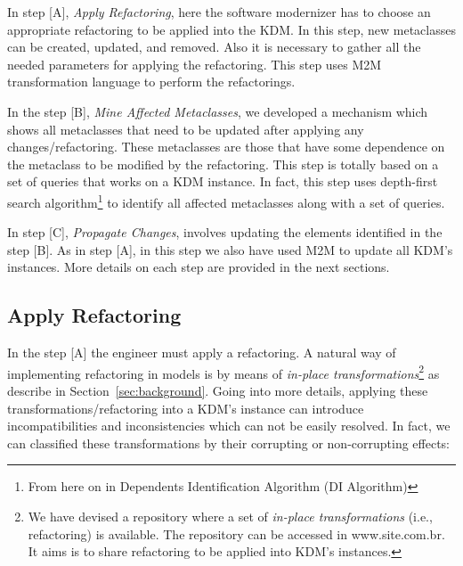 In step [A], \textit{Apply Refactoring}, here the software modernizer has to choose an appropriate refactoring to be applied into the KDM. In this step, new metaclasses can be created, updated, and removed. Also it is necessary to gather all the needed parameters for applying the refactoring. %
This step uses M2M transformation language to perform the refactorings.

In the step [B], \textit{Mine Affected Metaclasses}, we developed a mechanism which shows all metaclasses that need to be updated after applying any changes/refactoring. These metaclasses are those that have some dependence on the metaclass to be modified by the refactoring. This step is totally based on a set of queries that works on a KDM instance. In fact, this step uses depth-first search algorithm\footnote{From here on in Dependents Identification Algorithm (DI Algorithm)} to identify all affected metaclasses along with a set of queries. 

In step [C], \textit{Propagate Changes}, involves updating the elements identified in the step [B].  As in step [A], in this step we also have used M2M to update all KDM's instances. 
More details on each step are provided in the next sections.


\subsection{Apply Refactoring} %
\label{sub:apply_refactoring}

In the step [A] the engineer must apply a refactoring. A natural way of implementing refactoring in models is by means of \textit{in-place transformations}\footnote{We have devised a repository where a set of \textit{in-place transformations} (i.e., refactoring) is available. The repository can be accessed in www.site.com.br. It aims is to share refactoring to be applied into KDM's instances.} as describe in Section~\ref{sec:background}. %
Going into more details, applying these transformations/refactoring into a KDM's instance can introduce incompatibilities and inconsistencies which can not be easily resolved. In fact, we can classified these transformations by their corrupting or non-corrupting effects:%

